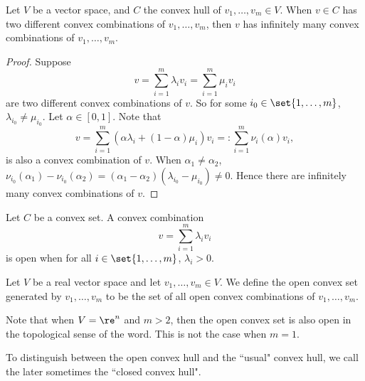 \documentclass[12pt,a4paper]{article}
\begin{document}
\begin{lemma}\label{lem:twoconvexcombinationsimpliesinfiniteconvexcombinations}
	Let $V$ be a vector space, and $C$ the convex hull of $v_1,\ldots,v_m\in V$. When $v\in C$ has two different convex combinations of $v_1,\ldots,v_m$, then $v$ has infinitely many convex combinations of $v_1,\ldots,v_m$. 
\end{lemma}
\begin{proof}
	Suppose 
	 \[
		v=\sum_{i=1}^m \lambda_iv_i=\sum_{i=1}^m \mu_iv_i
		\]
	are two different convex combinations of $v$. So for some $i_0\in\set{1,\ldots,m}$, $\lambda_{i_0}\neq \mu_{i_0}$. Let $\alpha\in[0,1]$. Note that 
	 \[
		v=\sum_{i=1}^m (\alpha \lambda_i+(1-\alpha)\mu_i)v_i=:\sum_{i=1}^m \nu_i(\alpha)v_i, 
		\]
		is also a convex combination of $v$. When $\alpha_1\neq\alpha_2$, $\nu_{i_0}(\alpha_1)-\nu_{i_0}(\alpha_2)=(\alpha_1-\alpha_2)(\lambda_{i_0}-\mu_{i_0})\neq0$. Hence there are infinitely many convex combinations of $v$.   
\end{proof}

\begin{definition}\label{def:openconvexcombination}
	Let $C$ be a convex set. A convex combination \[
	v=\sum_{i=1}^m \lambda_iv_i
	\]
	is open when for all $i\in\set{1,\ldots,m}$, $\lambda_i>0$. 
\end{definition} 



\begin{definition}
	Let $V$ be a real vector space and let $v_1,\ldots,v_m\in V$. We define the open convex set generated by $v_1,\ldots,v_m$ to be the set of all open convex combinations of $v_1,\ldots,v_m$. 
\end{definition}

Note that when $V=\re^n$ and $m>2$, then the open convex set is also open in the topological sense of the word. This is not the case when $m=1$. 

\begin{remark}
    To distinguish between the open convex hull and the ``usual" convex hull, we call the later sometimes the ``closed convex hull".  
\end{remark}
\end{document}
